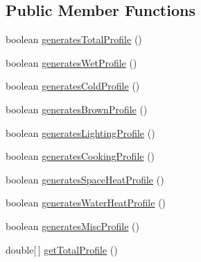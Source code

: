 \subsection*{Public Member Functions}
\begin{DoxyCompactItemize}
\item 
boolean \hyperlink{classuk_1_1ac_1_1dmu_1_1iesd_1_1cascade_1_1util_1_1profilegenerators_1_1_basic_profile_generator_af4e637ea0349f2c9e6148980ee608dc3}{generates\-Total\-Profile} ()
\item 
boolean \hyperlink{classuk_1_1ac_1_1dmu_1_1iesd_1_1cascade_1_1util_1_1profilegenerators_1_1_basic_profile_generator_a321a9812f901313cf1404af208558c0b}{generates\-Wet\-Profile} ()
\item 
boolean \hyperlink{classuk_1_1ac_1_1dmu_1_1iesd_1_1cascade_1_1util_1_1profilegenerators_1_1_basic_profile_generator_a11892ef1ce98f14c757d88e687ee1d10}{generates\-Cold\-Profile} ()
\item 
boolean \hyperlink{classuk_1_1ac_1_1dmu_1_1iesd_1_1cascade_1_1util_1_1profilegenerators_1_1_basic_profile_generator_abe255377e0c77973d194494771e2b33d}{generates\-Brown\-Profile} ()
\item 
boolean \hyperlink{classuk_1_1ac_1_1dmu_1_1iesd_1_1cascade_1_1util_1_1profilegenerators_1_1_basic_profile_generator_a7259e2c7433ac6b4778a19f60c5e8cf2}{generates\-Lighting\-Profile} ()
\item 
boolean \hyperlink{classuk_1_1ac_1_1dmu_1_1iesd_1_1cascade_1_1util_1_1profilegenerators_1_1_basic_profile_generator_a729d216207e782887cb6083008184624}{generates\-Cooking\-Profile} ()
\item 
boolean \hyperlink{classuk_1_1ac_1_1dmu_1_1iesd_1_1cascade_1_1util_1_1profilegenerators_1_1_basic_profile_generator_a356bad39bad89863790f4682e980ecd2}{generates\-Space\-Heat\-Profile} ()
\item 
boolean \hyperlink{classuk_1_1ac_1_1dmu_1_1iesd_1_1cascade_1_1util_1_1profilegenerators_1_1_basic_profile_generator_aae1be9f2c99b3dc6c78b3b28bc0a6be8}{generates\-Water\-Heat\-Profile} ()
\item 
boolean \hyperlink{classuk_1_1ac_1_1dmu_1_1iesd_1_1cascade_1_1util_1_1profilegenerators_1_1_basic_profile_generator_a9c6940d3660118c015b2f94a8251e97b}{generates\-Misc\-Profile} ()
\item 
double\mbox{[}$\,$\mbox{]} \hyperlink{classuk_1_1ac_1_1dmu_1_1iesd_1_1cascade_1_1util_1_1profilegenerators_1_1_basic_profile_generator_aa7116d50484ababf5453516210b5d937}{get\-Total\-Profile} ()
\item 

\end{DoxyCompactItemize}
